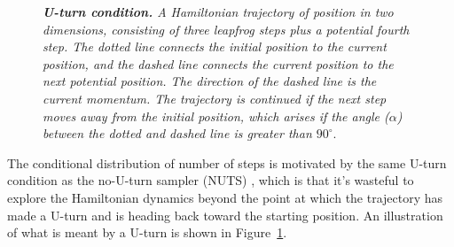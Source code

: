 \documentclass[ejs]{imsart}
\theoremstyle{plain}%
\theoremstyle{remark}
\begin{document}
\begin{figure}[t]
\usetikzlibrary{arrows.meta, angles, quotes, calc}
\caption{\it {\bfseries U-turn condition.}  A Hamiltonian trajectory of position in two dimensions, consisting of three leapfrog steps plus a potential fourth step.  The dotted line connects the initial position to the current position, and the dashed line connects the current position to the next potential position.  The direction of the dashed line is the current momentum. The trajectory is continued if the next step moves away from the initial position, which arises if the angle ($\alpha$) between the dotted and dashed line is greater than $90^\circ.$}
    \label{fig:u-turn-condition}
\end{figure}

The conditional distribution of number of steps is motivated by the same U-turn condition as the no-U-turn sampler (NUTS) \cite{HoGe2014}, which is that it's wasteful to explore the Hamiltonian dynamics beyond the point at which the trajectory has made a U-turn and is heading back toward the starting position.  An illustration of what is meant by a U-turn is shown in Figure~\ref{fig:u-turn-condition}.  
\end{document}
